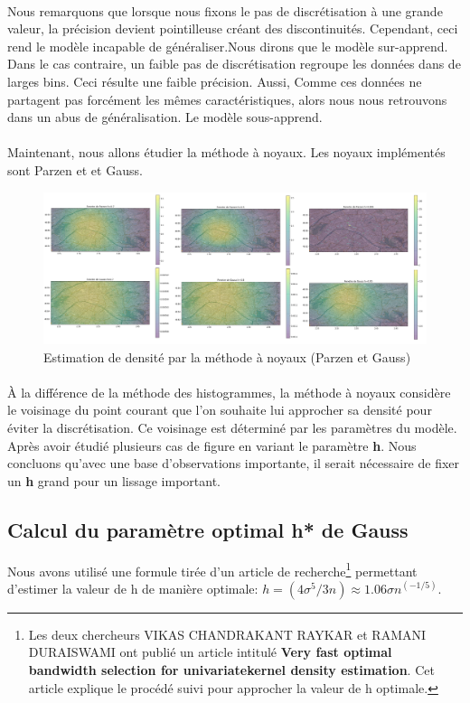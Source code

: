 \documentclass{report}
\begin{document}
\paragraph{}
Nous remarquons que lorsque nous fixons le pas de discrétisation à une grande valeur, la précision devient pointilleuse créant des discontinuités. Cependant, ceci rend le modèle incapable de généraliser.Nous dirons que le modèle sur-apprend. Dans le cas contraire, un faible pas de discrétisation regroupe les données dans de larges bins. Ceci résulte une faible précision. Aussi, Comme ces données ne partagent pas forcément les mêmes caractéristiques, alors  nous nous retrouvons dans un abus de généralisation. Le modèle sous-apprend.
\paragraph{}
Maintenant, nous allons étudier la méthode à noyaux. Les noyaux implémentés sont Parzen et et Gauss.
\begin{figure}[H]
	\begin{center}
		\includegraphics[width=1\textwidth]{parzen_vs_gauss.png}
		\caption{Estimation de densité par la méthode à noyaux (Parzen et Gauss)}
	\end{center}
\end{figure}
\paragraph{}
À la différence de la méthode des histogrammes, la méthode à noyaux considère le voisinage du point courant que l'on souhaite lui approcher sa densité pour éviter la discrétisation. Ce voisinage est déterminé par les paramètres du modèle. Après avoir étudié plusieurs cas de figure en variant le paramètre \textbf{h}. Nous concluons qu'avec une base d'observations importante, il serait nécessaire de fixer un \textbf{h} grand pour un lissage important. 
\subsection{Calcul du paramètre optimal h* de Gauss }
Nous avons utilisé une formule tirée d'un article de recherche\footnote{Les deux chercheurs VIKAS CHANDRAKANT RAYKAR et RAMANI DURAISWAMI ont publié un article intitulé \textbf{Very fast optimal bandwidth selection for univariatekernel density estimation}. Cet article explique le procédé suivi pour approcher la valeur de h optimale.} permettant d'estimer la valeur de h de manière optimale: $h=(4\sigma^5/3n) \approx 1.06\sigma n^(-1/5)$.
\end{document}
